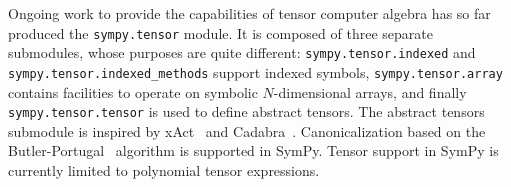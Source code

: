Ongoing work to provide the capabilities of tensor computer algebra has so far
produced the \texttt{sympy.tensor} module.  It is composed of three separate
submodules, whose purposes are quite different: \texttt{sympy.\allowbreak{}tensor.\allowbreak{}indexed} and
\texttt{sympy.\allowbreak{}tensor.\allowbreak{}indexed\_methods} support indexed symbols,
\texttt{sympy.\allowbreak{}tensor.\allowbreak{}array} contains facilities to operate on symbolic $N$-dimensional
arrays, and finally \texttt{sympy.\allowbreak{}tensor.\allowbreak{}tensor} is used to define abstract tensors.
The abstract tensors submodule
is inspired by xAct~\cite{xAct} and Cadabra~\cite{Peeters2007cadabra}.
Canonicalization based on the Butler-Portugal~\cite{ManssurPortugal1999}
algorithm is supported in SymPy.  Tensor support in SymPy is currently limited to polynomial tensor
expressions.
